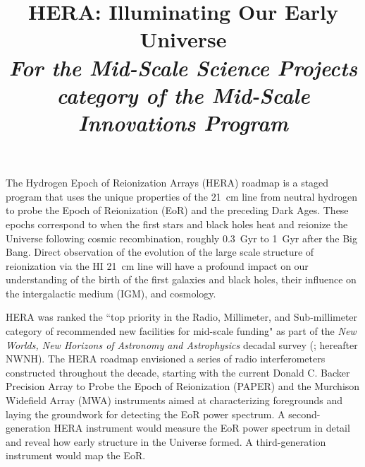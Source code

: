 \documentclass[preprint]{aastex}
\def\HI{{H{\small I }}}
\begin{document}
\title{HERA: Illuminating Our Early Universe\\
{\it For the Mid-Scale Science Projects category of the Mid-Scale Innovations Program}} 



{ \setlength{\parindent}{0cm}
The Hydrogen Epoch of Reionization Arrays (HERA) roadmap is a staged 
program that uses the unique properties of the 21~cm line from neutral 
hydrogen to probe the 
Epoch of Reionization (EoR) and the preceding Dark Ages.  These epochs
correspond to
when the first stars and black holes heat and reionize the
Universe following cosmic recombination, roughly
0.3~Gyr to 1~Gyr after the Big Bang. Direct observation of the evolution of the
large scale structure of reionization via the \HI 21~cm line will have a profound impact on our
understanding of the birth of the first galaxies and black holes, their
influence on the intergalactic medium (IGM), and cosmology.}  

HERA was ranked the ``top priority in the Radio, Millimeter, and Sub-millimeter
category of recommended new facilities for mid-scale funding" as part of the
{\it New Worlds, New Horizons of Astronomy and Astrophysics} decadal survey
(\citealt{astro2010}; hereafter NWNH).  
The HERA roadmap envisioned a series of
radio interferometers constructed throughout the decade, starting with the current
Donald C. Backer Precision Array to Probe the Epoch of Reionization (PAPER) and 
the Murchison Widefield Array (MWA) instruments 
aimed at characterizing
foregrounds and laying the groundwork for detecting the EoR power
spectrum. A second-generation HERA instrument would measure the EoR power spectrum in
detail and reveal how early structure in the Universe formed. A
third-generation instrument would map the EoR.
\end{document}
